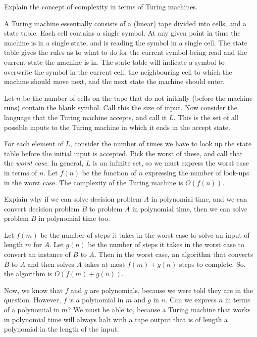 \documentclass[addpoints,12pt]{exam}
\begin{document}
\begin{questions}
\question
  Explain the concept of complexity in terms of Turing machines.
  \begin{solution}
    A Turing machine essentially consists of a (linear) tape divided into cells, and a state table.
    Each cell contains a single symbol.
    At any given point in time the machine is in a single state, and is reading the symbol in a single cell.
    The state table gives the rules as to what to do for the current symbol being read and the current state the machine is in.
    The state table will indicate a symbol to overwrite the symbol in the current cell, the neighbouring cell to which the machine should move next, and the next state the machine should enter.

    Let $n$ be the number of cells on the tape that do not initially (before the machine runs) contain the blank symbol.
    Call this the size of input.
    Now consider the language that the Turing machine accepts, and call it $L$.
    This is the set of all possible inputs to the Turing machine in which it ends in the accept state.
    
    For each element of $L$, consider the number of times we have to look up the state table before the initial input is accepted.
    Pick the worst of these, and call that the \emph{worst case}.
    In general, $L$ is an infinite set, so we must express the worst case in terms of $n$.
    Let $f(n)$ be the function of $n$ expressing the number of look-ups in the worst case.
    The complexity of the Turing machine is $O(f(n))$.
  \end{solution}

\question
  Explain why if we can solve decision problem $A$ in polynomial time, and we can convert decision problem $B$ to problem $A$ in polynomial time, then we can solve problem $B$ in polynomial time too.
  \begin{solution}
    Let $f(m)$ be the number of steps it takes in the worst case to solve an input of length $m$ for $A$.
    Let $g(n)$ be the number of steps it takes in the worst case to convert an instance of $B$ to $A$.
    Then in the worst case, an algorithm that converts $B$ to $A$ and then solves $A$ takes at most $f(m)+g(n)$ steps to complete.
    So, the algorithm is $O(f(m)+g(n))$.

    Now, we know that $f$ and $g$ are polynomials, because we were told they are in the question.
    However, $f$ is a polynomial in $m$ and $g$ in $n$.
    Can we express $n$ in terms of a polynomial in $m$?
    We must be able to, because a Turing machine that works in polynomial time will always halt with a tape output that is of length a polynomial in the length of the input. 
  \end{solution}

\end{questions}




\end{document}
